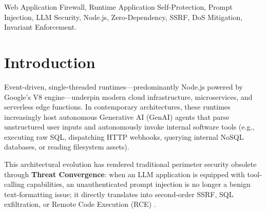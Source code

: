 \documentclass[conference]{IEEEtran}
\begin{document}
\begin{IEEEkeywords}
Web Application Firewall, Runtime Application Self-Protection, Prompt Injection, LLM Security, Node.js, Zero-Dependency, SSRF, DoS Mitigation, Invariant Enforcement.
\end{IEEEkeywords}

\section{Introduction}
Event-driven, single-threaded runtimes---predominantly Node.js powered by Google's V8 engine---underpin modern cloud infrastructure, microservices, and serverless edge functions. In contemporary architectures, these runtimes increasingly host autonomous Generative AI (GenAI) agents that parse unstructured user inputs and autonomously invoke internal software tools (e.g., executing raw SQL, dispatching HTTP webhooks, querying internal NoSQL databases, or reading filesystem assets).

This architectural evolution has rendered traditional perimeter security obsolete through \textbf{Threat Convergence}: when an LLM application is equipped with tool-calling capabilities, an unauthenticated prompt injection is no longer a benign text-formatting issue; it directly translates into second-order SSRF, SQL exfiltration, or Remote Code Execution (RCE) \cite{greshake2024}.
\end{document}
